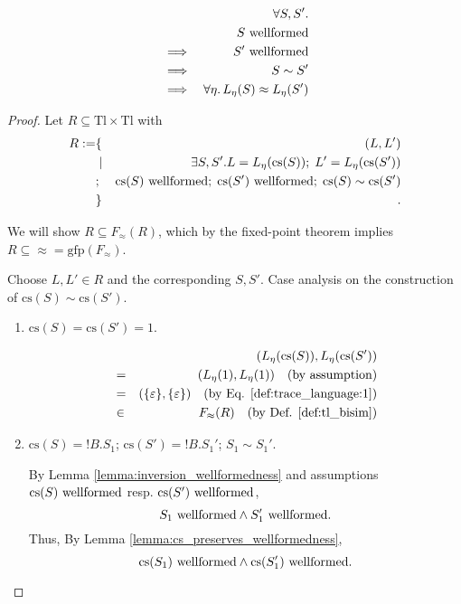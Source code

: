 \documentclass{llncs}
\newcommand*{\Tl}{\mathrm{Tl}}
\newcommand*{\gfp}{\mathrm{gfp}}
\newcommand*{\bisim}{\approx}
\newcommand*{\cs}{\mathrm{cs}}
\newcommand*{\sequiv}{\sim}
\newcommand*{\send}{\mathord{!}}
\newcommand*{\wf}[1]{\text{$#1$ {\normalfont \rmfamily wellformed}}}
\renewcommand*{\|}{\;|\;}
\begin{document}
\begin{theorem}
  \label{th:equivalence_equality}
  \begin{eqnarray*}
    &&         \forall S, S'. \\
    &&         \wf{S} \\
    &\implies& \wf{S'} \\
    &\implies& S \sequiv S' \\
    &\implies& \forall \eta.\, L_\eta(S) \bisim L_\eta(S')
  \end{eqnarray*}
\end{theorem}

\begin{proof}
  Let $R \subseteq \Tl \times \Tl$ with
  \begin{eqnarray*}
    R :=
    &\{&   (L, L') \\
    &\mid& \exists S, S'. L = L_\eta(\cs(S));\; L' = L_\eta(\cs(S')) \\
    &;\;&  \wf{\cs(S)};\; \wf{\cs(S')};\; \cs(S) \sequiv \cs(S') \\
    &\}&.
  \end{eqnarray*}

  We will show $R \subseteq F_\bisim(R)$, which by the fixed-point theorem
  implies $R \subseteq \bisim = \gfp(F_\bisim)$.

  Choose $L, L' \in R$ and the corresponding $S, S'$. Case analysis on the
  construction of $\cs(S) \sequiv \cs(S')$.
  \begin{enumerate}
    \item
      \label{case:equivalence_equality:unit}
      $\cs(S) = \cs(S') = 1$.

      \begin{eqnarray*}
        &&  (L_\eta(\cs(S)), L_\eta(\cs(S')) \\
        &=& (L_\eta(1), L_\eta(1))
        \quad \text{(by assumption)} \\
        &=& (\{\varepsilon\}, \{\varepsilon\})
        \quad \text{(by Eq. \ref{def:trace_language:1})} \\
        &\in& F_\bisim(R)
        \quad \text{(by Def. \ref{def:tl_bisim})}
      \end{eqnarray*}

    \item
      \label{case:equivalence_equality:send}
      $\cs(S) = \send B.S_1$; $\cs(S') = \send B.S_1'$; $S_1 \sequiv S_1'$.

      By Lemma \ref{lemma:inversion_wellformedness} and assumptions
      $\wf{\cs(S)}$ resp. $\wf{\cs(S')}$,
      \begin{equation*}
        \wf{S_1} \land \wf{S_1'}.
      \end{equation*}
      Thus, By Lemma \ref{lemma:cs_preserves_wellformedness},
      \begin{equation}
        \label{eq:equivalence_equality:send:wf}
        \wf{\cs(S_1)} \land \wf{\cs(S_1')}.
      \end{equation}


\end{enumerate}
\end{proof}
\end{document}
